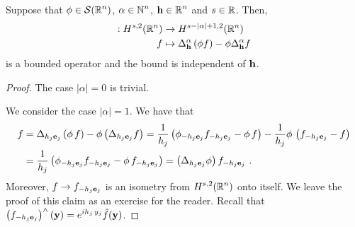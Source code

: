 \begin{prop} \label{ell_reg_prop1}
Suppose that $\displaystyle \phi \in \mathcal{S}(\mathbb{R}^n)$,
$\displaystyle \alpha \in \mathbb{N}^n$, $\displaystyle \mathbf{h}\in \mathbb{R}^n$
and $s \in \mathbb{R}$.  Then,
\begin{align*}
[\Delta^\alpha_{\VEC{h}}, \phi]: H^{s,2}(\RR^n) &\rightarrow 
H^{s-|\alpha|+1,2}(\RR^n) \\
f &\mapsto \Delta^\alpha_{\VEC{h}} \left( \phi f \right) -
\phi \Delta^\alpha_\VEC{h} f
\end{align*}
is a bounded operator and the bound is independent of $\mathbf{h}$.
\end{prop}

\begin{proof}
The case $|\alpha|=0$ is trivial.
  
 We consider the case $|\alpha|=1$.  We have that
\begin{align*}
[\Delta_{h_j\VEC{e}_j},\phi] f
&= \Delta_{h_j\VEC{e}_j} \left( \phi\, f \right) -
\phi \left( \Delta_{h_j\VEC{e}_j} f \right)
= \frac{1}{h_j} \left( \phi_{-h_j\VEC{e}_j} f_{-h_j\VEC{e}_j}
- \phi\, f \right)
- \frac{1}{h_j} \phi \,\left( f_{-h_j\VEC{e}_j} - f \right) \\
&= \frac{1}{h_j} \left( \phi_{-h_j\VEC{e}_j} f_{-h_j\VEC{e}_j}
- \phi \, f_{-h_j\VEC{e}_j} \right)
= \left( \Delta_{h_j\VEC{e}_j} \phi \right) f_{-h_j\VEC{e}_j} \ .
\end{align*}
Moreover, $\displaystyle f \to f_{-h_j\mathbf{e}_j}$ is an isometry from
$\displaystyle H^{s,2}(\mathbb{R}^n)$ onto itself. We leave the proof of this
claim as an exercise for the reader.  Recall that
$\displaystyle \left(f_{-h_j\mathbf{e}_j}\right)^\wedge(\mathbf{y}) = e^{i h_j\,y_j}
\hat{f}(\mathbf{y})$.


\end{proof}
